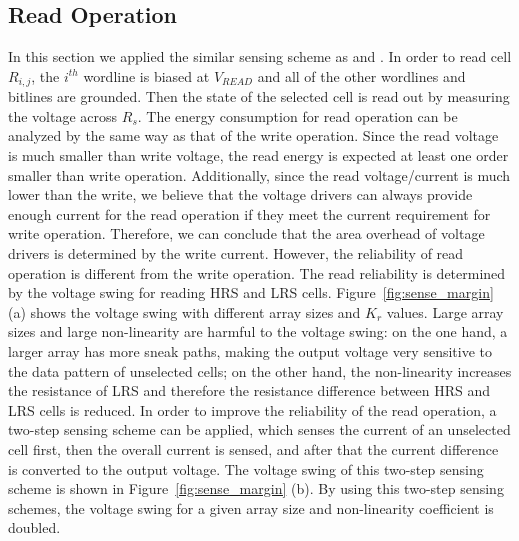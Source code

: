 \subsection{Read Operation}
In this section we applied the similar sensing scheme as \cite{crossbar_TED_2010} and \cite{crossbar_NANO08_Flocke}. In order to read cell $R_{i,j}$, the $i^{th}$ wordline is biased at $V_{READ}$ and all of the other wordlines and bitlines are grounded. Then the state of the selected cell is read out by measuring the voltage across $R_s$. The energy consumption for read operation can be analyzed by the same way as that of the write operation. Since the read voltage is much smaller than write voltage, the read energy is expected at least one order smaller than write operation. Additionally, since the read voltage/current is much lower than the write, we believe that the voltage drivers can always provide enough current for the read operation if they meet the current requirement for write operation. Therefore, we can conclude that the area overhead of voltage drivers is determined by the write current. However, the reliability of read operation is different from the write operation. The read reliability is determined by the voltage swing for reading HRS and LRS cells. Figure~\ref{fig:sense_margin} (a) shows the voltage swing with different array sizes and $K_r$ values. Large array sizes and large non-linearity are harmful to the voltage swing: on the one hand, a larger array has more sneak paths, making the output voltage very sensitive to the data pattern of unselected cells; on the other hand, the non-linearity increases the resistance of LRS and therefore the resistance difference between HRS and LRS cells is reduced. In order to improve the reliability of the read operation, a two-step sensing scheme can be applied, which senses the current of an unselected cell first, then the overall current is sensed, and after that the current difference is converted to the output voltage. The voltage swing of this two-step sensing scheme is shown in Figure~\ref{fig:sense_margin} (b). By using this two-step sensing schemes, the voltage swing for a given array size and non-linearity coefficient is doubled.

%

